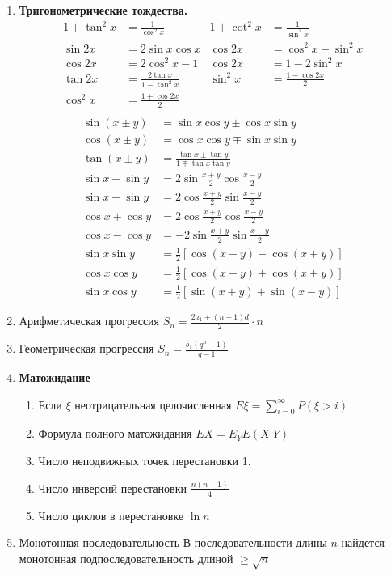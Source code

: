 \begin{enumerate}
    \item \textbf{Тригонометрические тождества.}
    {\small
    \begin{align*}
        1 + \tan^2 x &= \frac{1}{\cos^2 x} &
        1 + \cot^2 x &= \frac{1}{\sin^2 x} \\
        \sin 2x &= 2\sin x\cos x &
        \cos 2x &= \cos^2 x - \sin^2 x \\
        \cos 2x &= 2\cos^2 x - 1 &
        \cos 2x &= 1 - 2\sin^2 x \\
        \tan 2x &= \frac{2\tan x}{1-\tan^2 x} &
        \sin^2 x &= \frac{1-\cos 2x}{2} \\
        \cos^2 x &= \frac{1+\cos 2x}{2} \\
    \end{align*}
    \vspace{-15mm}
    \begin{align*}
        \sin(x \pm y) &= \sin x\cos y \pm \cos x\sin y \\
        \cos(x \pm y) &= \cos x\cos y \mp \sin x\sin y \\
        \tan(x \pm y) &= \frac{\tan x \pm \tan y}{1 \mp \tan x\tan y} \\
        \sin x + \sin y &= 2\sin\frac{x+y}{2}\cos\frac{x-y}{2} \\
        \sin x - \sin y &= 2\cos\frac{x+y}{2}\sin\frac{x-y}{2} \\
        \cos x + \cos y &= 2\cos\frac{x+y}{2}\cos\frac{x-y}{2} \\
        \cos x - \cos y &= -2\sin\frac{x+y}{2}\sin\frac{x-y}{2} \\
        \sin x\sin y &= \frac{1}{2}[\cos(x-y)-\cos(x+y)] \\
        \cos x\cos y &= \frac{1}{2}[\cos(x-y)+\cos(x+y)] \\
        \sin x\cos y &= \frac{1}{2}[\sin(x+y)+\sin(x-y)]
    \end{align*}
    }
    \item {Арифметическая прогрессия} $S_n = \frac{2a_1 + (n - 1) d}{2} \cdot n $
    \item {Геометрическая прогрессия} $S_n = \frac{b_1 (q^n - 1)}{q - 1}$
    \item \textbf{Матожидание}
    \begin{enumerate}
        \item Если $\xi$ неотрицательная целочисленная $E \xi = \sum_{i=0}^\infty P(\xi > i)$
        \item Формула полного матожидания $E X = E_Y E(X | Y)$
        \item Число неподвижных точек перестановки 1.
        \item Число инверсий перестановки $\frac{n(n-1)}{4}$
        \item Число циклов в перестановке $\ln n$
    \end{enumerate}
    \item {Монотонная последовательность} В последовательности длины $n$ найдется монотонная подпоследовательность длиной $\ge \sqrt n$ 

\end{enumerate}
